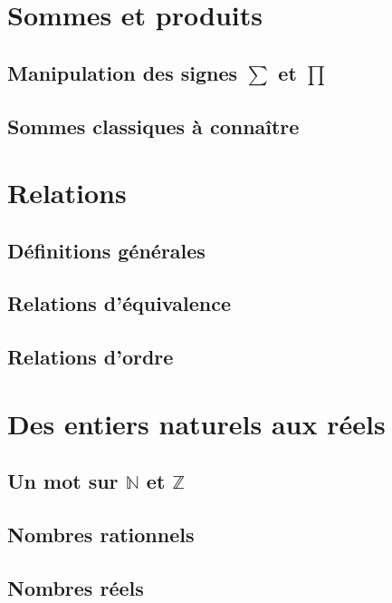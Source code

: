 \documentclass[11pt,twoside,a4paper]{article}
\begin{document}
\newpage
\section{Sommes et produits}

\subsection{Manipulation des signes $\sum$ et $\prod$}

\subsection{Sommes classiques à connaître}

\newpage
\section{Relations}

\subsection{Définitions générales}

\subsection{Relations d'équivalence}

\subsection{Relations d'ordre}

\newpage
\section{Des entiers naturels aux réels}

\subsection{Un mot sur $\mathbb{N}$ et $\mathbb{Z}$}

\subsection{Nombres rationnels}

\subsection{Nombres réels}
\end{document}
